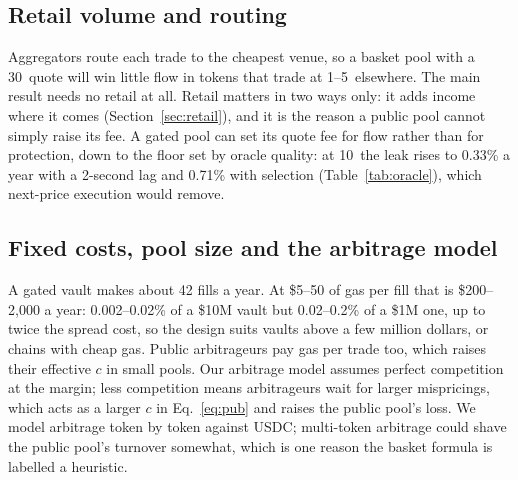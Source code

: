 \subsection{Retail volume and routing}
Aggregators route each trade to the cheapest venue, so a basket pool with a 30\bps\ quote will win little flow in tokens that trade at 1--5\bps\ elsewhere. The main result needs no retail at all. Retail matters in two ways only: it adds income where it comes (Section~\ref{sec:retail}), and it is the reason a public pool cannot simply raise its fee. A gated pool can set its quote fee for flow rather than for protection, down to the floor set by oracle quality: at 10\bps\ the leak rises to 0.33\% a year with a 2-second lag and 0.71\% with selection (Table~\ref{tab:oracle}), which next-price execution would remove.

\subsection{Fixed costs, pool size and the arbitrage model}
A gated vault makes about 42 fills a year. At \$5--50 of gas per fill that is \$200--2{,}000 a year: 0.002--0.02\% of a \$10M vault but 0.02--0.2\% of a \$1M one, up to twice the spread cost, so the design suits vaults above a few million dollars, or chains with cheap gas. Public arbitrageurs pay gas per trade too, which raises their effective $c$ in small pools. Our arbitrage model assumes perfect competition at the margin; less competition means arbitrageurs wait for larger mispricings, which acts as a larger $c$ in Eq.~\eqref{eq:pub} and raises the public pool's loss. We model arbitrage token by token against USDC; multi-token arbitrage could shave the public pool's turnover somewhat, which is one reason the basket formula is labelled a heuristic.
